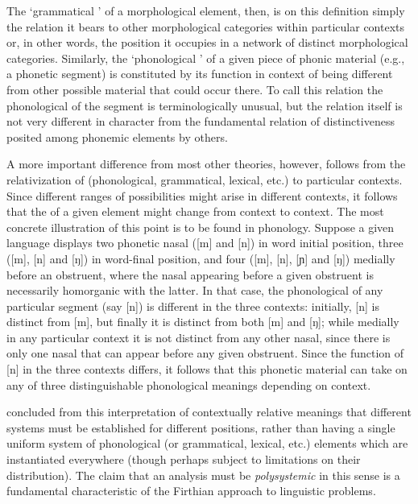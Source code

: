 The `grammatical ' of a morphological element, then, is on this
definition simply the relation it bears to other morphological
categories within particular contexts or, in other words, the position
it occupies in a network of distinct morphological
categories. Similarly, the `phonological ' of a given piece of
phonic material (e.g., a phonetic segment) is constituted by its
function in context of being different from other possible material
that could occur there. To call this relation the phonological 
of the segment is terminologically unusual, but the relation itself is
not very different in character from the fundamental relation of
distinctiveness posited among phonemic elements by others.

A more important difference from most other theories, however, follows
from the relativization of  (phonological, grammatical,
lexical, etc.) to particular contexts. Since different ranges of
possibilities might arise in different contexts, it follows that the
 of a given element might change from context to context. The
most concrete illustration of this point is to be found in
phonology. Suppose a given language displays two phonetic nasal
 ([m] and [n]) in word initial position, three ([m], [n] and
[ŋ]) in word-final position, and four ([m], [n], [ɲ] and [ŋ])
medially before an obstruent, where the nasal appearing before a given
obstruent is necessarily homorganic with the latter. In that case,
the phonological  of any particular segment (say [n]) is
different in the three contexts: initially, [n] is distinct from [m],
but finally it is distinct from both [m] and [ŋ]; while medially in
any particular context it is not distinct from any other nasal, since
there is only one nasal that can appear before any given
obstruent. Since the function of [n] in the three contexts differs, it
follows that this phonetic material can take on any of three
distinguishable phonological meanings depending on context.

{\Firth} concluded from this interpretation of contextually relative
meanings that different systems must be established for different
positions, rather than having a single uniform system of phonological
(or grammatical, lexical, etc.) elements which are instantiated
everywhere (though perhaps subject to limitations on their
distribution). The claim that an analysis must be \emph{polysystemic}
in this sense is a fundamental characteristic of the Firthian approach
to linguistic problems.

